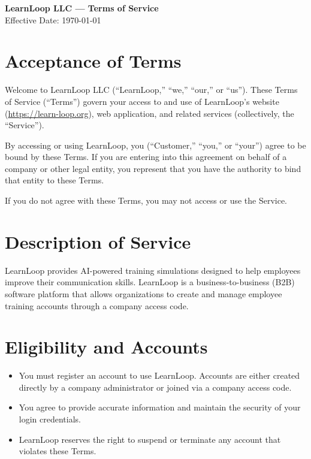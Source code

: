 \documentclass[12pt]{article}
\begin{document}
\begin{center}
    \Large{\textbf{LearnLoop LLC — Terms of Service}} \\[0.3em]
    \normalsize{Effective Date: \today} \\[1em]
\end{center}

\onehalfspacing

\section{Acceptance of Terms}
Welcome to LearnLoop LLC (“LearnLoop,” “we,” “our,” or “us”). These Terms of Service (“Terms”) govern your access to and use of LearnLoop’s website (\href{https://learn-loop.org}{https://learn-loop.org}), web application, and related services (collectively, the “Service”).

By accessing or using LearnLoop, you (“Customer,” “you,” or “your”) agree to be bound by these Terms. If you are entering into this agreement on behalf of a company or other legal entity, you represent that you have the authority to bind that entity to these Terms.

If you do not agree with these Terms, you may not access or use the Service.

\section{Description of Service}
LearnLoop provides AI-powered training simulations designed to help employees improve their communication skills. LearnLoop is a business-to-business (B2B) software platform that allows organizations to create and manage employee training accounts through a company access code.

\section{Eligibility and Accounts}
\begin{itemize}[leftmargin=*]
    \item You must register an account to use LearnLoop. Accounts are either created directly by a company administrator or joined via a company access code.
    \item You agree to provide accurate information and maintain the security of your login credentials.
    \item LearnLoop reserves the right to suspend or terminate any account that violates these Terms.
\end{itemize}
\end{document}
